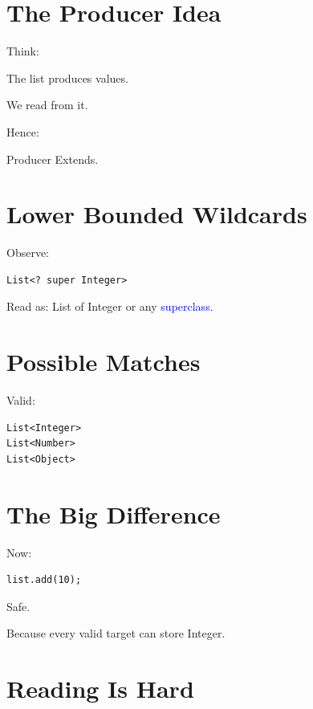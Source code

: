 \documentclass[11pt,a4paper]{book}
\begin{document}
\section{The Producer Idea}

Think:

The list produces values.

We read from it.

Hence:

\begin{rosettarule}

Producer Extends.

\end{rosettarule}

\section{Lower Bounded Wildcards}

Observe:

\begin{verbatim} 
List<? super Integer>
\end{verbatim}

Read as:
List of Integer
or any \textcolor{blue}{superclass}.

\section{Possible Matches}

Valid:

\begin{verbatim} 
List<Integer>
List<Number>
List<Object>
\end{verbatim}

\section{The Big Difference}

Now:

\begin{verbatim} 
list.add(10);
\end{verbatim}

\textcolor{RosettaSeaGreen}{Safe}.

Because every valid target
can store Integer.

\section{Reading Is Hard}
\end{document}
